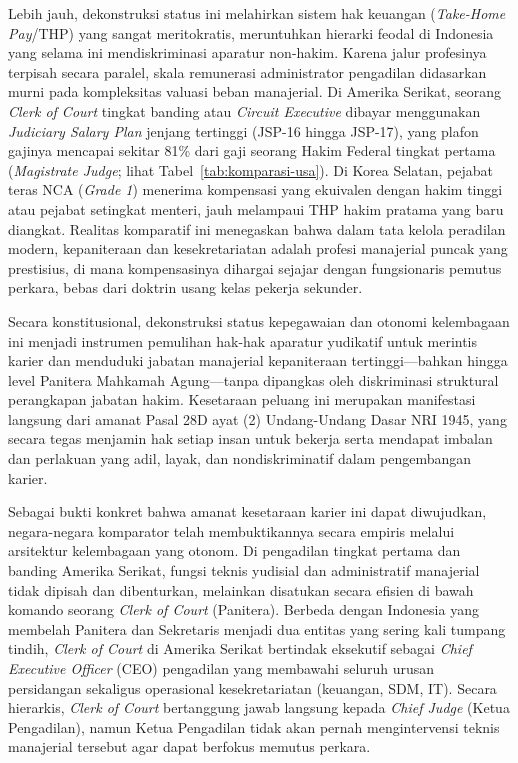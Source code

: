 \documentclass[12pt, a4paper]{article}
\begin{document}
Lebih jauh, dekonstruksi status ini melahirkan sistem hak keuangan (\textit{Take-Home Pay}/THP) yang sangat meritokratis, meruntuhkan hierarki feodal di Indonesia yang selama ini mendiskriminasi aparatur non-hakim. Karena jalur profesinya terpisah secara paralel, skala remunerasi administrator pengadilan didasarkan murni pada kompleksitas valuasi beban manajerial. Di Amerika Serikat, seorang \textit{Clerk of Court} tingkat banding atau \textit{Circuit Executive} dibayar menggunakan \textit{Judiciary Salary Plan} jenjang tertinggi (JSP-16 hingga JSP-17), yang plafon gajinya mencapai sekitar 81\% dari gaji seorang Hakim Federal tingkat pertama (\textit{Magistrate Judge}; lihat Tabel~\ref{tab:komparasi-usa}). Di Korea Selatan, pejabat teras NCA (\textit{Grade 1}) menerima kompensasi yang ekuivalen dengan hakim tinggi atau pejabat setingkat menteri, jauh melampaui THP hakim pratama yang baru diangkat. Realitas komparatif ini menegaskan bahwa dalam tata kelola peradilan modern, kepaniteraan dan kesekretariatan adalah profesi manajerial puncak yang prestisius, di mana kompensasinya dihargai sejajar dengan fungsionaris pemutus perkara, bebas dari doktrin usang kelas pekerja sekunder.

Secara konstitusional, dekonstruksi status kepegawaian dan otonomi kelembagaan ini menjadi instrumen pemulihan hak-hak aparatur yudikatif untuk merintis karier dan menduduki jabatan manajerial kepaniteraan tertinggi—bahkan hingga level Panitera Mahkamah Agung—tanpa dipangkas oleh diskriminasi struktural perangkapan jabatan hakim. Kesetaraan peluang ini merupakan manifestasi langsung dari amanat Pasal 28D ayat (2) Undang-Undang Dasar NRI 1945, yang secara tegas menjamin hak setiap insan untuk bekerja serta mendapat imbalan dan perlakuan yang adil, layak, dan nondiskriminatif dalam pengembangan karier. 

Sebagai bukti konkret bahwa amanat kesetaraan karier ini dapat diwujudkan, negara-negara komparator telah membuktikannya secara empiris melalui arsitektur kelembagaan yang otonom. Di pengadilan tingkat pertama dan banding Amerika Serikat, fungsi teknis yudisial dan administratif manajerial tidak dipisah dan dibenturkan, melainkan disatukan secara efisien di bawah komando seorang \textit{Clerk of Court} (Panitera). Berbeda dengan Indonesia yang membelah Panitera dan Sekretaris menjadi dua entitas yang sering kali tumpang tindih, \textit{Clerk of Court} di Amerika Serikat bertindak eksekutif sebagai \textit{Chief Executive Officer} (CEO) pengadilan yang membawahi seluruh urusan persidangan sekaligus operasional kesekretariatan (keuangan, SDM, IT). Secara hierarkis, \textit{Clerk of Court} bertanggung jawab langsung kepada \textit{Chief Judge} (Ketua Pengadilan), namun Ketua Pengadilan tidak akan pernah mengintervensi teknis manajerial tersebut agar dapat berfokus memutus perkara. 
\end{document}
